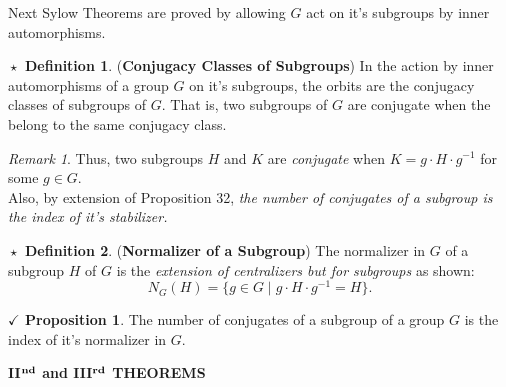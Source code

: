 \documentclass{article}
\theoremstyle{definition}
\newtheorem{definition}{$\boxed{\star}$ Definition}
\theoremstyle{remark}
\newtheorem*{remark}{Remark}
\theoremstyle{definition}
\theoremstyle{definition}
\newtheorem{proposition}{$\checkmark$ Proposition}
\theoremstyle{definition}
\theoremstyle{proof}
\newcommand{\inv}[1]{#1^{-1}}
\begin{document}
Next Sylow Theorems are proved by allowing $ G $ act on it's subgroups by inner automorphisms.
\begin{definition}
	(\textbf{Conjugacy Classes of Subgroups}) In the action by inner automorphisms of a group $ G $ on it's subgroups, the orbits are the conjugacy classes of subgroups of $ G $. That is, two subgroups of $ G $ are conjugate when the belong to the same conjugacy class.
\end{definition}
\begin{remark}
	Thus, two subgroups $ H $ and $ K $ are \emph{conjugate} when $ K = g\cdot H \cdot \inv{g} $ for some $ g\in G $.\\
	Also, by extension of Proposition 32, \emph{the number of conjugates of a subgroup is the index of it's stabilizer.} 
\end{remark}
\hrulefill
\begin{definition}
	(\textbf{Normalizer of a Subgroup}) The normalizer in $ G $ of a subgroup $ H $ of $ G $ is the \emph{extension of centralizers but for subgroups} as shown:
	\[N_G(H) = \{g\in G\;\vert\;g\cdot H\cdot \inv{g} = H\}.\]
\end{definition}
\hrulefill
\begin{proposition}
	The number of conjugates of a subgroup of a group $ G $ is the index of it's normalizer in $ G $.
\end{proposition}
\hrulefill
\textbf{II$ ^{\text{\textbf{nd}}} $ and III$ ^{\text{\textbf{rd}}} $  THEOREMS}
\hrulefill
\end{document}
